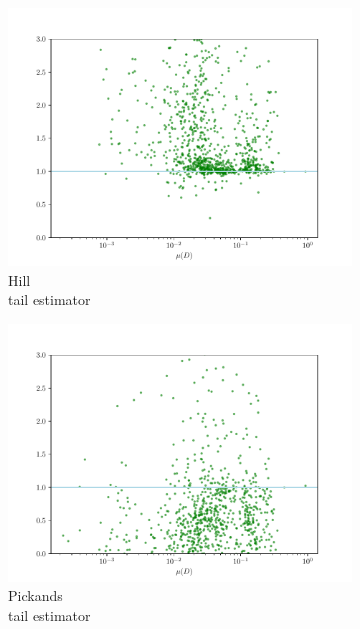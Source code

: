 \documentclass[12pt,a4paper,automark, toc=bib]{scrreprt}
\theoremstyle{definition}
\begin{document}
\begin{figure}
\begin{subfigure}{0.32\linewidth}
			\includegraphics[width=\linewidth]{figures/stat_sha384_0hill_est_div.pdf}
			\caption{Hill\\tail estimator}
		\end{subfigure}
		\begin{subfigure}{0.32\linewidth}
			\includegraphics[width=\linewidth]{figures/stat_sha384_0pickands_est_div.pdf}
			\caption{Pickands\\tail estimator}
		\end{subfigure}
		\begin{subfigure}{0.32\linewidth}

\end{subfigure}
\end{figure}
\end{document}
